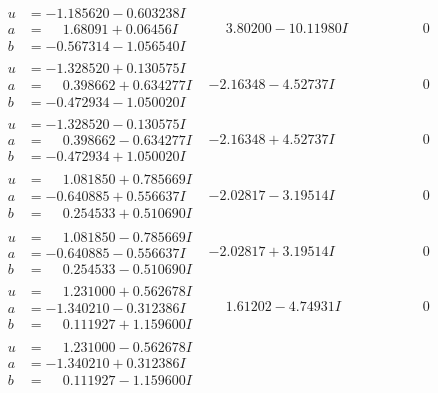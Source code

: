\documentclass[1p]{elsarticle_modified}
\theoremstyle{definition}
\begin{document}
$$\begin{array}{c|c|c}
\begin{aligned}
u &= -1.185620 - 0.603238 I \\
a &= \phantom{-}1.68091 + 0.06456 I \\
b &= -0.567314 - 1.056540 I\end{aligned}
 & \phantom{-}3.80200 - 10.11980 I & \phantom{-0.000000 } 0 \\ \hline\begin{aligned}
u &= -1.328520 + 0.130575 I \\
a &= \phantom{-}0.398662 + 0.634277 I \\
b &= -0.472934 - 1.050020 I\end{aligned}
 & -2.16348 - 4.52737 I & \phantom{-0.000000 } 0 \\ \hline\begin{aligned}
u &= -1.328520 - 0.130575 I \\
a &= \phantom{-}0.398662 - 0.634277 I \\
b &= -0.472934 + 1.050020 I\end{aligned}
 & -2.16348 + 4.52737 I & \phantom{-0.000000 } 0 \\ \hline\begin{aligned}
u &= \phantom{-}1.081850 + 0.785669 I \\
a &= -0.640885 + 0.556637 I \\
b &= \phantom{-}0.254533 + 0.510690 I\end{aligned}
 & -2.02817 - 3.19514 I & \phantom{-0.000000 } 0 \\ \hline\begin{aligned}
u &= \phantom{-}1.081850 - 0.785669 I \\
a &= -0.640885 - 0.556637 I \\
b &= \phantom{-}0.254533 - 0.510690 I\end{aligned}
 & -2.02817 + 3.19514 I & \phantom{-0.000000 } 0 \\ \hline\begin{aligned}
u &= \phantom{-}1.231000 + 0.562678 I \\
a &= -1.340210 - 0.312386 I \\
b &= \phantom{-}0.111927 + 1.159600 I\end{aligned}
 & \phantom{-}1.61202 - 4.74931 I & \phantom{-0.000000 } 0 \\ \hline\begin{aligned}
u &= \phantom{-}1.231000 - 0.562678 I \\
a &= -1.340210 + 0.312386 I \\
b &= \phantom{-}0.111927 - 1.159600 I\end{aligned}

\end{array}$$
\end{document}
